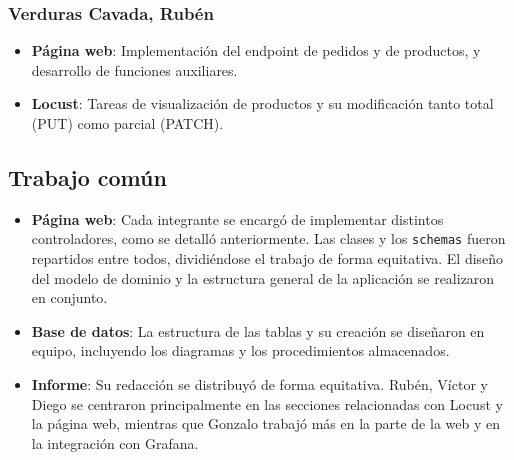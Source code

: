 \documentclass[10pt]{book}
\begin{document}
\subsubsection*{Verduras Cavada, Rubén}
\begin{itemize}
    \item \textbf{Página web}: Implementación del endpoint de pedidos y de productos, y desarrollo de funciones auxiliares.
    \item \textbf{Locust}: Tareas de visualización de productos y su modificación tanto total (PUT) como parcial (PATCH).
\end{itemize}

\subsection{Trabajo común}
\begin{itemize}
    \item \textbf{Página web}: Cada integrante se encargó de implementar distintos controladores, como se detalló anteriormente. Las clases y los \texttt{schemas} fueron repartidos entre todos, dividiéndose el trabajo de forma equitativa. El diseño del modelo de dominio y la estructura general de la aplicación se realizaron en conjunto.
    \item \textbf{Base de datos}: La estructura de las tablas y su creación se diseñaron en equipo, incluyendo los diagramas y los procedimientos almacenados.
    \item \textbf{Informe}: Su redacción se distribuyó de forma equitativa. Rubén, Víctor y Diego se centraron principalmente en las secciones relacionadas con Locust y la página web, mientras que Gonzalo trabajó más en la parte de la web y en la integración con Grafana.
\end{itemize}

\printbibliography
\end{document}

